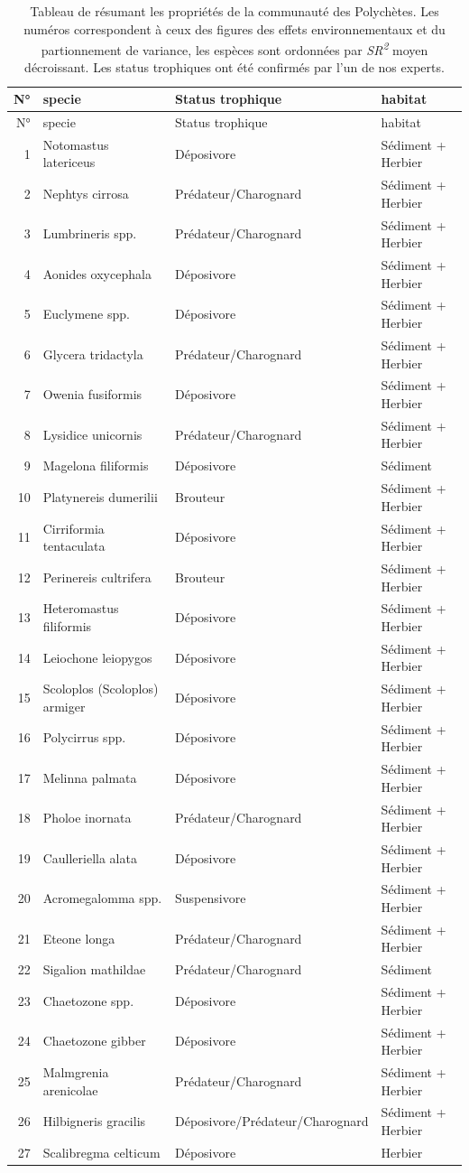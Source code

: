 \documentclass[12pt,]{article}
\begin{document}
{\small
\begin{longtable}[]{@{}rlll@{}}
\caption{Tableau de résumant les propriétés de la communauté des
Polychètes. Les numéros correspondent à ceux des figures des effets
environnementaux et du partionnement de variance, les espèces sont
ordonnées par \emph{SR\textsuperscript{2}} moyen décroissant. Les status
trophiques ont été confirmés par l'un de nos experts.
\label{tbl:sp}}\tabularnewline
\toprule
N° & specie & Status trophique & habitat\tabularnewline
\midrule
\endfirsthead
\toprule
N° & specie & Status trophique & habitat\tabularnewline
\midrule
\endhead
1 & Notomastus latericeus & Déposivore & Sédiment +
Herbier\tabularnewline
2 & Nephtys cirrosa & Prédateur/Charognard & Sédiment +
Herbier\tabularnewline
3 & Lumbrineris spp. & Prédateur/Charognard & Sédiment +
Herbier\tabularnewline
4 & Aonides oxycephala & Déposivore & Sédiment + Herbier\tabularnewline
5 & Euclymene spp. & Déposivore & Sédiment + Herbier\tabularnewline
6 & Glycera tridactyla & Prédateur/Charognard & Sédiment +
Herbier\tabularnewline
7 & Owenia fusiformis & Déposivore & Sédiment + Herbier\tabularnewline
8 & Lysidice unicornis & Prédateur/Charognard & Sédiment +
Herbier\tabularnewline
9 & Magelona filiformis & Déposivore & Sédiment\tabularnewline
10 & Platynereis dumerilii & Brouteur & Sédiment +
Herbier\tabularnewline
11 & Cirriformia tentaculata & Déposivore & Sédiment +
Herbier\tabularnewline
12 & Perinereis cultrifera & Brouteur & Sédiment +
Herbier\tabularnewline
13 & Heteromastus filiformis & Déposivore & Sédiment +
Herbier\tabularnewline
14 & Leiochone leiopygos & Déposivore & Sédiment +
Herbier\tabularnewline
15 & Scoloplos (Scoloplos) armiger & Déposivore & Sédiment +
Herbier\tabularnewline
16 & Polycirrus spp. & Déposivore & Sédiment + Herbier\tabularnewline
17 & Melinna palmata & Déposivore & Sédiment + Herbier\tabularnewline
18 & Pholoe inornata & Prédateur/Charognard & Sédiment +
Herbier\tabularnewline
19 & Caulleriella alata & Déposivore & Sédiment + Herbier\tabularnewline
20 & Acromegalomma spp. & Suspensivore & Sédiment +
Herbier\tabularnewline
21 & Eteone longa & Prédateur/Charognard & Sédiment +
Herbier\tabularnewline
22 & Sigalion mathildae & Prédateur/Charognard & Sédiment\tabularnewline
23 & Chaetozone spp. & Déposivore & Sédiment + Herbier\tabularnewline
24 & Chaetozone gibber & Déposivore & Sédiment + Herbier\tabularnewline
25 & Malmgrenia arenicolae & Prédateur/Charognard & Sédiment +
Herbier\tabularnewline
26 & Hilbigneris gracilis & Déposivore/Prédateur/Charognard & Sédiment +
Herbier\tabularnewline
27 & Scalibregma celticum & Déposivore & Herbier\tabularnewline

\end{longtable}}
\end{document}
